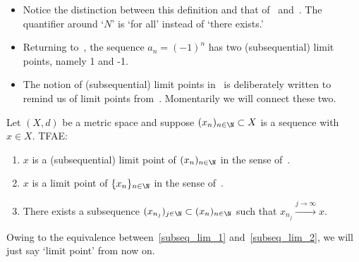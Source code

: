 \begin{rem}
\begin{itemize}
	\item Notice the distinction between this definition and that of~ and~. The quantifier around `$N$' is `for all' instead of `there exists.'
	\item Returning to~, the sequence $a_n = (-1)^n$ has two (subsequential) limit points, namely 1 and -1.
	\item The notion of (subsequential) limit points in~ is deliberately written to remind us of limit points from~. Momentarily we will connect these two.
\end{itemize}
\end{rem}
\begin{prop}
\label{prop:subseq_lim}
Let $(X,d)$ be a metric space and suppose $(x_n)_{n\in\N}\subset X$ is a sequence with $x\in X$. TFAE:
\begin{enumerate}
	\item \label{subseq_lim_1} $x$ is a (subsequential) limit point of $(x_n)_{n\in\N}$ in the sense of~.
	\item \label{subseq_lim_2} $x$ is a limit point of $\{x_n\}_{n\in\N}$ in the sense of~.
	\item \label{subseq_lim_3} There exists a subsequence $(x_{n_j})_{j\in\N}\subset (x_n)_{n\in\N}$ such that $x_{n_j}\overset{j\to \infty}{\to}x$.
\end{enumerate}
\end{prop}
Owing to the equivalence between~\ref{subseq_lim_1} and~\ref{subseq_lim_2}, we will just say `limit point' from now on.
